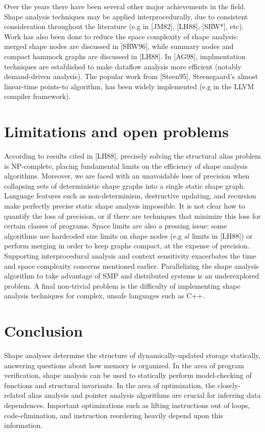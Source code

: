 \documentclass{article}
\begin{document}
Over the years there have been several other major achievements in the
field. Shape analysis techniques may be applied interprocedurally, due to
consistent consideration throughout the literature (e.g in [JM82], [LH88],
[SRW*], etc). Work has also been done to reduce the space complexity of
shape analysis: merged shape nodes are discussed in [SRW96], while summary
nodes and compact hammock graphs are discussed in [LH88]. In [AG98],
implmentation techniques are established to make dataflow analysis more
efficient (notably demand-driven analysis). The popular work from [Steen95],
Steensgaard's almost linear-time points-to algorithm, has been widely
implemented (e.g in the LLVM compiler framework).

\section{Limitations and open problems}

According to results cited in [LH88], precisely solving the structural alias
problem is NP-complete, placing fundamental limits on the efficiency of
shape analysis algorithms. Moreover, we are faced with an unavoidable loss
of precision when collapsing sets of deterministic shape graphs into a
single static shape graph. Language features such as non-determinism,
destructive updating, and recursion make perfectly precise static shape
analysis impossible. It is not clear how to quantify the loss of precision,
or if there are techniques that minimize this loss for certain classes of
programs. Space limits are also a pressing issue: some algorithms use
hardcoded size limits on shape nodes (e.g $sl$ limits in [LH88]) or perform
merging in order to keep graphs compact, at the expense of precision.
Supporting interprocedural analysis and context sensitivity exacerbates the
time and space complexity concerns mentioned earlier. Parallelizing the
shape analysis algorithm to take advantage of SMP and distributed systems is
an underexplored problem. A final non-trivial problem is the difficulty of
implementing shape analysis techniques for complex, unsafe languages such as
C++.

\section{Conclusion}

Shape analyses determine the structure of dynamically-updated storage
statically, answering questions about how memory is organized. In the area
of program verification, shape analysis can be used to statically perform
model-checking of functions and structural invariants. In the area of
optimization, the closely-related alias analysis and pointer analysis
algorithms are crucial for inferring data dependences. Important
optimizations such as lifting instructions out of loops, code-elimination,
and instruction reordering heavily depend upon this information.
\end{document}
